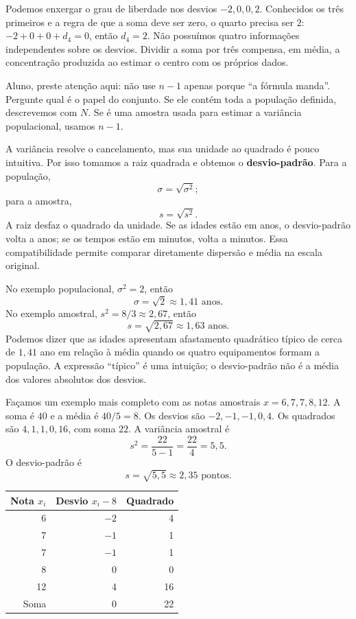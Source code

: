 Podemos enxergar o grau de liberdade nos desvios $-2,0,0,2$. Conhecidos os três primeiros e a regra de que a soma deve ser zero, o quarto precisa ser $2$: $-2+0+0+d_4=0$, então $d_4=2$. Não possuímos quatro informações independentes sobre os desvios. Dividir a soma por três compensa, em média, a concentração produzida ao estimar o centro com os próprios dados.

\begin{GuidedBox}
Aluno, preste atenção aqui: não use $n-1$ apenas porque ``a fórmula manda''. Pergunte qual é o papel do conjunto. Se ele contém toda a população definida, descrevemos com $N$. Se é uma amostra usada para estimar a variância populacional, usamos $n-1$.
\end{GuidedBox}

A variância resolve o cancelamento, mas sua unidade ao quadrado é pouco intuitiva. Por isso tomamos a raiz quadrada e obtemos o \textbf{desvio-padrão}. Para a população,
\[
\sigma=\sqrt{\sigma^2};
\]
para a amostra,
\[
s=\sqrt{s^2}.
\]
A raiz desfaz o quadrado da unidade. Se as idades estão em anos, o desvio-padrão volta a anos; se os tempos estão em minutos, volta a minutos. Essa compatibilidade permite comparar diretamente dispersão e média na escala original.

No exemplo populacional, $\sigma^2=2$, então
\[
\sigma=\sqrt{2}\approx1{,}41\text{ anos}.
\]
No exemplo amostral, $s^2=8/3\approx2{,}67$, então
\[
s=\sqrt{2{,}67}\approx1{,}63\text{ anos}.
\]
Podemos dizer que as idades apresentam afastamento quadrático típico de cerca de $1{,}41$ ano em relação à média quando os quatro equipamentos formam a população. A expressão ``típico'' é uma intuição; o desvio-padrão não é a média dos valores absolutos dos desvios.

Façamos um exemplo mais completo com as notas amostrais $x={6,7,7,8,12}$. A soma é $40$ e a média é $40/5=8$. Os desvios são $-2,-1,-1,0,4$. Os quadrados são $4,1,1,0,16$, com soma $22$. A variância amostral é
\[
s^2=\frac{22}{5-1}=\frac{22}{4}=5{,}5.
\]
O desvio-padrão é
\[
s=\sqrt{5{,}5}\approx2{,}35\text{ pontos}.
\]

\begin{center}
\small
\begin{tabular}{@{}rrr@{}}
\toprule
Nota $x_i$ & Desvio $x_i-8$ & Quadrado \\
\midrule
6 & $-2$ & 4 \\
7 & $-1$ & 1 \\
7 & $-1$ & 1 \\
8 & 0 & 0 \\
12 & 4 & 16 \\
\midrule
Soma & 0 & 22 \\
\bottomrule
\end{tabular}
\end{center}

